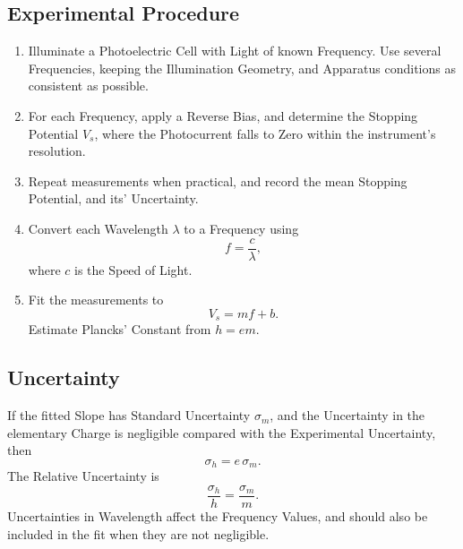 \documentclass[a4paper, 10pt, onepage]{elegantbook}
\begin{document}

\subsection{Experimental Procedure}

\begin{enumerate}
  \item Illuminate a Photoelectric Cell with Light of known Frequency. Use several Frequencies, keeping the Illumination Geometry, and
  Apparatus conditions as consistent as possible.
  \item For each Frequency, apply a Reverse Bias, and determine the
  Stopping Potential \(V_s\), where the Photocurrent falls to Zero
  within the instrument's resolution.
  \item Repeat measurements when practical, and record the mean
  Stopping Potential, and its' Uncertainty.
  \item Convert each Wavelength \(\lambda\) to a Frequency using
  \[
  f=\frac{c}{\lambda},
  \]
  where \(c\) is the Speed of Light.
  \item Fit the measurements to
  \[
  V_s=mf+b.
  \]
  Estimate Plancks' Constant from \(h=em\).
\end{enumerate}

\subsection{Uncertainty}

If the fitted Slope has Standard Uncertainty \(\sigma_m\), and the Uncertainty in the elementary Charge is negligible compared with the Experimental Uncertainty, then
\[
\sigma_h=e\,\sigma_m.
\]
The Relative Uncertainty is
\[
\frac{\sigma_h}{h}=\frac{\sigma_m}{m}.
\]
Uncertainties in Wavelength affect the Frequency Values, and should also be included in the fit when they are not negligible.
\end{document}
